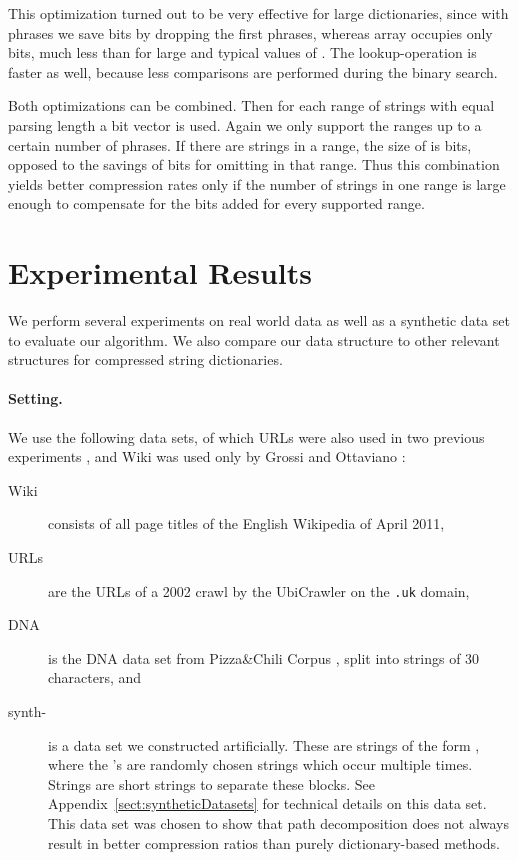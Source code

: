 \documentclass{llncs}
\begin{document}
This optimization turned out to be very effective for large dictionaries, since with  phrases we save  bits by dropping the first phrases, whereas array  occupies only  bits, much less than  for large  and typical values of . The lookup-operation is faster as well, because less comparisons are performed during the binary search.

Both optimizations can be combined. Then for each range of strings with equal parsing length  a bit vector  is used. Again we only support the ranges up to a certain number of phrases. If there are  strings in a range, the size of  is  bits, opposed to the savings of  bits for omitting  in that range. Thus this combination yields better compression rates only if the number of strings in one range is large enough to compensate for the  bits added for every supported range.

\section{Experimental Results}
We perform several experiments on real world data as well as a synthetic data set to evaluate our algorithm. We also compare our data structure to other relevant structures for compressed string dictionaries.
\paragraph{Setting.}
We use the following data sets, of which URLs were also used in two previous experiments \cite{grossi12fast,brisaboa11compressed}, and Wiki was used only by Grossi and Ottaviano \cite{grossi12fast}:
\begin{description}
\item[Wiki] consists of all page titles of the English Wikipedia of April 2011,
\item[URLs] are the URLs of a 2002 crawl by the UbiCrawler \cite{BCSV04-UbiCrawler} on the \texttt{.uk} domain,
\item[DNA] is the DNA data set from Pizza\&Chili Corpus \cite{PizzaChiliDNA}, split into strings of 30 characters, and
\item[synth-] is a data set we constructed artificially. These are strings of the form , where the 's are randomly chosen strings which occur multiple times. Strings  are short strings to separate these blocks. See Appendix~\ref{sect:syntheticDatasets} for technical details on 
this data set.
This data set was chosen to show that path decomposition does not always result in better compression ratios than purely dictionary-based methods.
\end{description}
\end{document}
